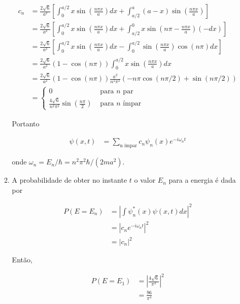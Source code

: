 \documentclass[a4paper, 12pt, notitlepage]{article}
\begin{document}
\begin{enumerate}
\begin{enumerate}
  \begin{align*}
  c_n &= \frac{2\sqrt{6}}{a^2}\left[ \int_0^{a/2} x \sin\left(\frac{n\pi x}{a}\right) dx + \int_{a/2}^a (a-x)\sin\left(\frac{n\pi x}{a}\right) \right] \\
  &= \frac{2\sqrt{6}}{a^2} \left[ \int_0^{a/2} x \sin\left(\frac{n\pi x}{a}\right) dx  + \int_{a/2}^0 x \sin\left(n\pi - \frac{n\pi x}{a}\right) (-dx) \right] \\
  &= \frac{2\sqrt{6}}{a^2} \left[ \int_0^{a/2} x \sin\left(\frac{n\pi x}{a}\right) dx - \int_0^{a/2} \sin\left(\frac{n\pi x}{a}\right) \cos(n\pi) dx \right] \\
  &= \frac{2\sqrt{6}}{a^2}\left(1 - \cos(n\pi)\right) \int_0^{a/2} x \sin\left(\frac{n\pi x}{a}\right) dx \\
  &= \frac{2\sqrt{6}}{a^2}\left(1 - \cos(n\pi)\right) \frac{a^2}{n^2 \pi^2} \left(-n\pi \cos(n\pi/2) + \sin(n\pi/2)\right) \\
  &= 
  \begin{cases}
  0 &\text{ para $n$ par} \\
  \frac{4\sqrt{6}}{n^2 \pi^2} \sin\left(\frac{n\pi}{2}\right) &\text{ para $n$ ímpar}
  \end{cases}
  \end{align*}
  
  Portanto
  
  \begin{align*}
  \psi(x,t) &= \sum_{\text{n ímpar}} c_n \psi_n(x) e^{-i\omega_n t}
  \end{align*}
  
  \noindent onde $\omega_n = E_n/\hbar = n^2\pi^2\hbar/(2ma^2)$.
  
  \item A probabilidade de obter no instante $t$ o valor $E_n$ para  a energia é dada por
  
  \begin{align*}
  P(E = E_n) &= \left|\int \psi_n^{\ast}(x) \psi(x, t) dx\right|^2 \\
  &= \left|c_n e^{-i\omega_n t}\right|^2 \\
  &= \left|c_n\right|^2
  \end{align*}
  
  Então,
  
  \begin{align*}
  P(E = E_1) &= \left|\frac{4\sqrt{6}}{\pi^2}\right|^2 \\
  &= \frac{96}{\pi^4}
  \end{align*}

\end{enumerate}


\end{enumerate}
\end{document}
